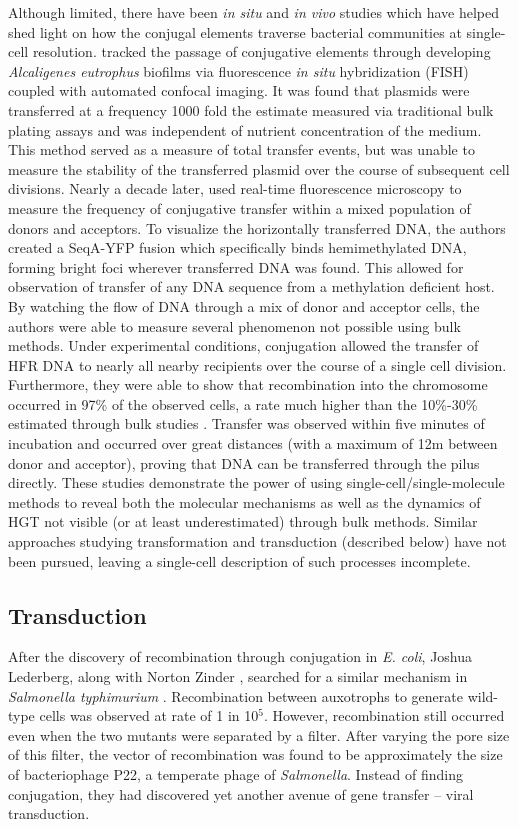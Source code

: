 Although limited, there have been \textit{in situ} and \textit{in vivo} studies
which have helped shed light on how the conjugal elements traverse bacterial
communities at single-cell resolution. \citet{Hausner:1999ua} tracked the
passage of conjugative elements through developing \textit{Alcaligenes
eutrophus} biofilms via fluorescence \textit{in situ} hybridization (FISH)
coupled with automated confocal imaging.  It was found that plasmids were
transferred at a frequency 1000 fold the estimate measured via traditional bulk
plating assays and was independent of nutrient concentration of the medium. This
method served as a measure of total transfer events, but was unable to measure
the stability of the transferred plasmid over the course of subsequent cell
divisions. Nearly a decade later, \citet{Babic:2008bl} used real-time
fluorescence microscopy to measure the
frequency of conjugative transfer within a mixed population of donors and
acceptors. To visualize the horizontally transferred DNA, the authors created a
SeqA-YFP fusion which specifically binds hemimethylated DNA, forming bright foci
wherever transferred DNA was found.  This allowed for observation of transfer of
any DNA sequence from a methylation deficient host. By watching the flow of DNA
through a mix of donor and acceptor cells, the authors were able to measure
several phenomenon not possible using bulk methods. Under experimental
conditions, conjugation allowed the transfer of HFR DNA to nearly all nearby
recipients over the course of a single cell division. Furthermore, they were
able to show that  recombination into the chromosome occurred in 97\% of the
observed cells, a rate much higher than the 10\%-30\% estimated through bulk
studies \cite{Rayssiguier:1991to}.  Transfer was observed within five minutes of
incubation and occurred over great distances (with a maximum of 12\textmu m between
donor and acceptor), proving that DNA can be transferred through the  pilus
directly. These studies demonstrate the power of using
single-cell/single-molecule methods to reveal both the molecular mechanisms as
well as the dynamics of HGT not visible (or at least underestimated) through
bulk methods.  Similar approaches studying transformation and transduction
(described below) have not been pursued, leaving a single-cell
description of such processes incomplete. 

\subsection*{Transduction}
\indent After the discovery of recombination through conjugation in \textit{E. coli},
Joshua Lederberg, along with Norton Zinder , searched for a similar mechanism in
\textit{Salmonella typhimurium} \cite{Zinder:1952ug}. Recombination between
auxotrophs to generate wild-type cells was observed at rate of 1 in 10$^5$.
However, recombination still occurred even when the two mutants were
separated by a filter. After varying the pore size of this filter, the vector of
recombination was found to be approximately the size of bacteriophage P22, a
temperate phage of \textit{Salmonella}.  Instead of finding conjugation, they
had discovered yet another avenue of gene transfer -- viral transduction.

